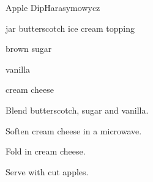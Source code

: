 \begin{recipe}{Apple Dip}{Harasymowycz}{}

\begin{ingredients}
\item jar butterscotch ice cream topping
\item \C{\half} brown sugar
\item {} vanilla
\item {} cream cheese
\end{ingredients}

\begin{directions}
\item Blend butterscotch, sugar and vanilla.
\item Soften cream cheese in a microwave.
\item Fold in cream cheese.
\item Serve with cut apples.
\end{directions}

\end{recipe}
